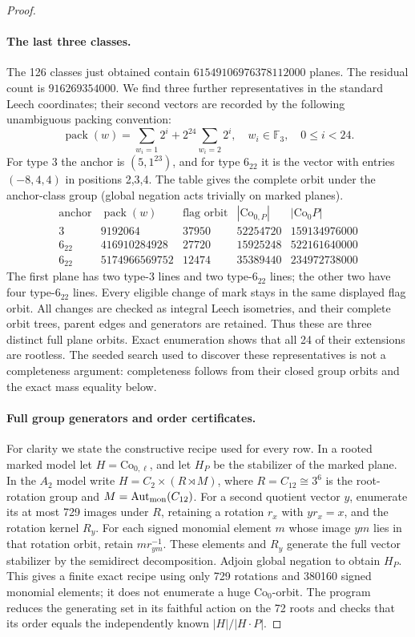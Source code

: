\begin{proof}
\paragraph{The last three classes.}
The 126 classes just obtained contain
\(61549106976378112000\) planes. The residual count is
\(916269354000\). We find three further representatives in the
standard Leech coordinates; their second vectors are recorded by
the following unambiguous packing convention:
\[
 \operatorname{pack}(w)=
   \sum_{w_i=1}2^i+2^{24}\sum_{w_i=2}2^i,
 \quad w_i\in\mathbb F_3,\quad 0\le i<24.
\]
For type 3 the anchor is \((5,1^{23})\), and for type \(6_{22}\)
it is the vector with entries \((-8,4,4)\) in positions 2,3,4.
The table gives the complete orbit under the anchor-class group
(global negation acts trivially on marked planes).
\[
\begin{array}{c|r|r|r|r}
\text{anchor}&\operatorname{pack}(w)&\text{flag orbit}&
 |\mathrm{Co}_{0,P}|&|\mathrm{Co}_0P|\\\hline
3&9192064&37950&52254720&159134976000\\
6_{22}&416910284928&27720&15925248&522161640000\\
6_{22}&5174966569752&12474&35389440&234972738000
\end{array}
\]
The first plane has two type-3 lines and two type-\(6_{22}\) lines;
the other two have four type-\(6_{22}\) lines. Every eligible change
of mark stays in the same displayed flag orbit. All changes are
checked as integral Leech isometries, and their complete orbit
trees, parent edges and generators are retained. Thus these are
three distinct full plane orbits. Exact enumeration shows that
all 24 of their extensions are rootless. The seeded search used
to discover these representatives is not a completeness argument:
completeness follows from their closed group orbits and the exact
mass equality below.

\paragraph{Full group generators and order certificates.}
For clarity we state the constructive recipe used for every row.
In a rooted marked model let \(H=\mathrm{Co}_{0,\ell}\), and let
\(H_P\) be the stabilizer of the marked plane. In the \(A_2\)
model write \(H=C_2\times(R\rtimes M)\), where
\(R=C_{12}\cong3^6\) is the root-rotation group and
\(M=\operatorname{Aut}_{\rm mon}(C_{12})\). For a second quotient
vector \(y\), enumerate its at most 729 images under \(R\),
retaining a rotation \(r_x\) with \(yr_x=x\), and the rotation
kernel \(R_y\). For each signed monomial element \(m\) whose
image \(ym\) lies in that rotation orbit, retain
\(m r_{ym}^{-1}\). These elements and \(R_y\) generate the full
vector stabilizer by the semidirect decomposition. Adjoin global
negation to obtain \(H_P\). This gives a finite exact recipe using
only 729 rotations and 380160 signed monomial elements; it does
not enumerate a huge \(\mathrm{Co}_0\)-orbit. The program reduces
the generating set in its faithful action on the 72 roots and
checks that its order equals the independently known
\(|H|/|H\cdot P|\).


\end{proof}
